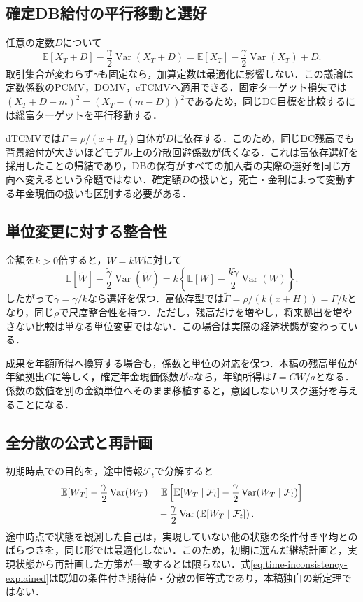 \documentclass[11pt,a4paper]{article}
\numberwithin{equation}{section}
\numberwithin{table}{section}
\numberwithin{figure}{section}
\theoremstyle{plain}
\theoremstyle{definition}
\newcommand{\E}{\mathbb{E}}
\DeclareMathOperator{\Var}{Var}
\begin{document}
\subsection{確定DB給付の平行移動と選好}
任意の定数$D$について
\begin{equation}
\E[X_T+D]-\frac\gamma2\Var(X_T+D)
=\E[X_T]-\frac\gamma2\Var(X_T)+D.
\end{equation}
取引集合が変わらず$\gamma$も固定なら，加算定数は最適化に影響しない．この議論は定数係数のPCMV，DOMV，cTCMVへ適用できる．固定ターゲット損失では$(X_T+D-m)^2=(X_T-(m-D))^2$であるため，同じDC目標を比較するには総富ターゲットを平行移動する．

dTCMVでは$\Gamma=\rho/(x+H_t)$自体が$D$に依存する．このため，同じDC残高でも背景給付が大きいほどモデル上の分散回避係数が低くなる．これは富依存選好を採用したことの帰結であり，DBの保有がすべての加入者の実際の選好を同じ方向へ変えるという命題ではない．確定額$D$の扱いと，死亡・金利によって変動する年金現価の扱いも区別する必要がある．

\subsection{単位変更に対する整合性}
金額を$k>0$倍すると，$\widetilde W=kW$に対して
\begin{equation}
\E[\widetilde W]-\frac{\widetilde\gamma}{2}\Var(\widetilde W)
=k\left\{\E[W]-\frac{k\widetilde\gamma}{2}\Var(W)\right\}.
\end{equation}
したがって$\widetilde\gamma=\gamma/k$なら選好を保つ．富依存型では$\widetilde\Gamma=\rho/(k(x+H))=\Gamma/k$となり，同じ$\rho$で尺度整合性を持つ．ただし，残高だけを増やし，将来拠出を増やさない比較は単なる単位変更ではない．この場合は実際の経済状態が変わっている．

成果を年額所得へ換算する場合も，係数と単位の対応を保つ．本稿の残高単位が年額拠出$C$に等しく，確定年金現価係数が$a$なら，年額所得は$I=CW/a$となる．係数の数値を別の金額単位へそのまま移植すると，意図しないリスク選好を与えることになる．

\subsection{全分散の公式と再計画}
初期時点での目的を，途中情報$\mathcal F_t$で分解すると
\begin{align}
\E[W_T]-\frac\gamma2\Var(W_T)
&=\E\left[\E[W_T\mid\mathcal F_t]-\frac\gamma2\Var(W_T\mid\mathcal F_t)\right]\notag\\
&\quad-\frac\gamma2\Var\left(\E[W_T\mid\mathcal F_t]\right).
\label{eq:time-inconsistency-explained}
\end{align}
途中時点で状態を観測した自己は，実現していない他の状態の条件付き平均とのばらつきを，同じ形では最適化しない．このため，初期に選んだ継続計画と，実現状態から再計画した方策が一致するとは限らない．式\eqref{eq:time-inconsistency-explained}は既知の条件付き期待値・分散の恒等式であり，本稿独自の新定理ではない．
\end{document}
